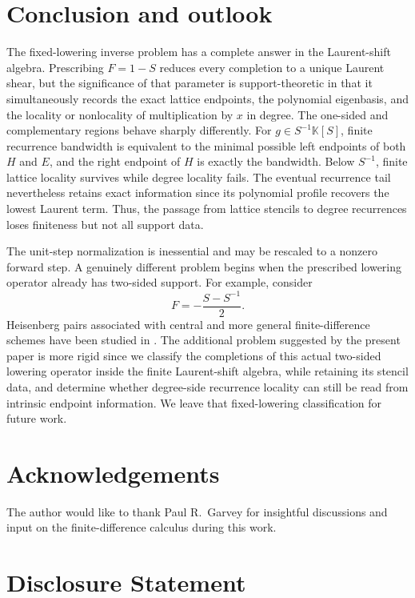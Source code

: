 \documentclass[11pt,reqno]{amsart}
\numberwithin{equation}{section}
\theoremstyle{definition}
\theoremstyle{remark}
\newcommand{\K}{\mathbb K}
\begin{document}
\section{Conclusion and outlook}

The fixed-lowering inverse problem has a complete answer in the Laurent-shift algebra.  Prescribing $F=1-S$ reduces every completion to a unique Laurent shear, but the significance of that parameter is support-theoretic in that it simultaneously records the exact lattice endpoints, the polynomial eigenbasis, and the locality or nonlocality of multiplication by $x$ in degree. The one-sided and complementary regions behave sharply differently.  For $g\in S^{-1}\K[S]$, finite recurrence bandwidth is equivalent to the minimal possible left endpoints of both $H$ and $E$, and the right endpoint of $H$ is exactly the bandwidth.  Below $S^{-1}$, finite lattice locality survives while degree locality fails.  The eventual recurrence tail nevertheless retains exact information since its polynomial profile recovers the lowest Laurent term.  Thus, the passage from lattice stencils to degree recurrences loses finiteness but not all support data.

The unit-step normalization is inessential and may be rescaled to a nonzero forward step.  A genuinely different problem begins when the prescribed lowering operator already has two-sided support.  For example, consider
\[
 F=-\frac{S-S^{-1}}{2}.
\]
Heisenberg pairs associated with central and more general finite-difference schemes have been studied in \cite{GorskiSzmigielski1998}.  The additional problem suggested by the present paper is more rigid since we classify the completions of this actual two-sided lowering operator inside the finite Laurent-shift algebra, while retaining its stencil data, and determine whether degree-side recurrence locality can still be read from intrinsic endpoint information.  We leave that fixed-lowering classification for future work.

\section*{Acknowledgements}

The author would like to thank Paul R.~Garvey for insightful discussions and input on the finite-difference calculus during this work. 

\section*{Disclosure Statement}
\end{document}
